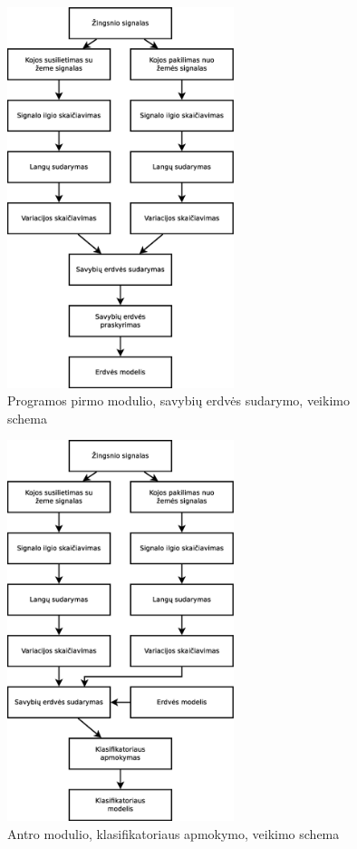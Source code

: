 \documentclass[]{vgtuef}
\begin{document}
\begin{figure}[!t]
  \centering
  \includegraphics[width=250px]{figures/pirma_faze.eps}
  \caption{Programos pirmo modulio, savybių erdvės sudarymo, veikimo schema}
  \label{fig:pirma_faze}
\end{figure}

\begin{figure}[!t]
  \centering
  \includegraphics[width=250px]{figures/antra_faze.eps}
  \caption{Antro modulio, klasifikatoriaus apmokymo, veikimo schema}
  \label{fig:antra_faze}
\end{figure}
\end{document}
